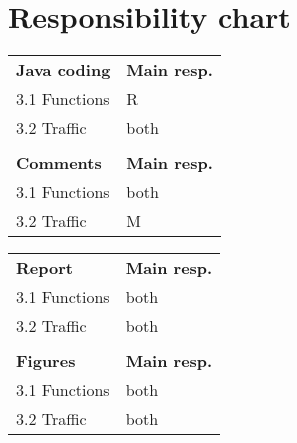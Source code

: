 \section*{Responsibility chart}


\begin{multicols}{2}

\begin{table}[H]
    \begin{tabular}{ll}
    \textbf{Java coding}      & \textbf{Main resp.} \\
    3.1 Functions & R       \\
    3.2 Traffic & both       \\
                &   \\
    \textbf{Comments}      & \textbf{Main resp.} \\
    3.1 Functions & both       \\
    3.2 Traffic & M        \\
    \end{tabular}
\end{table}

\begin{table}[H]
    \begin{tabular}{ll}
    \textbf{Report}      & \textbf{Main resp.} \\
    3.1 Functions & both       \\
    3.2 Traffic & both        \\
                &   \\
    \textbf{Figures}      & \textbf{Main resp.} \\
    3.1 Functions & both       \\
    3.2 Traffic & both        \\
    \end{tabular}
\end{table}

\end{multicols}

